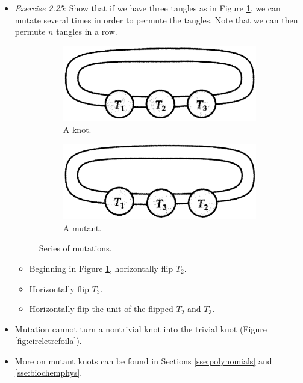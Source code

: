 \documentclass[titlepage]{article}
\numberwithin{figure}{section}
\numberwithin{table}{section}
\numberwithin{equation}{section}
\begin{document}
\begin{itemize}
\begin{itemize}
    \end{itemize}
    \item \emph{Exercise 2.25}: Show that if we have three tangles as in Figure \ref{fig:ex2-25a}, we can mutate several times in order to permute the tangles. Note that we can then permute $n$ tangles in a row.
    \begin{figure}[h!]
        \centering
        \begin{subfigure}[b]{0.4\linewidth}
            \centering
            \includegraphics[width=0.8\linewidth]{Blender/ex2-25a.png}
            \caption{A knot.}
            \label{fig:ex2-25a}
        \end{subfigure}
        \begin{subfigure}[b]{0.4\linewidth}
            \centering
            \includegraphics[width=0.8\linewidth]{Blender/ex2-25b.png}
            \caption{A mutant.}
            \label{fig:ex2-25b}
        \end{subfigure}
        \caption{Series of mutations.}
        \label{fig:ex2-9}
    \end{figure}
    \begin{itemize}
        \item Beginning in Figure \ref{fig:ex2-25a}, horizontally flip $T_2$.
        \item Horizontally flip $T_3$.
        \item Horizontally flip the unit of the flipped $T_2$ and $T_3$.
    \end{itemize}
    \item Mutation cannot turn a nontrivial knot into the trivial knot (Figure \ref{fig:circletrefoila}).
    \item More on mutant knots can be found in Sections \ref{sse:polynomials} and \ref{sse:biochemphys}.
\end{itemize}
\end{document}
